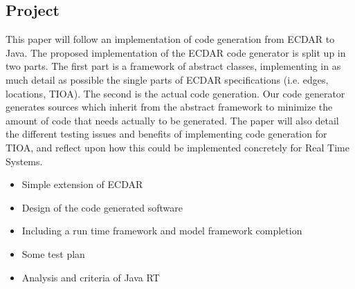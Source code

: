 \subsection{Project \label{introduction-problemfield}}
This paper will follow an implementation of code generation from ECDAR to
Java. The proposed implementation of the ECDAR code generator is split up in two
parts. The first part is a framework of abstract classes, implementing in as
much detail as possible the single parts of ECDAR specifications (i.e. edges,
locations, TIOA). The second is the actual code generation. Our code generator
generates sources which inherit from the abstract framework to minimize the
amount of code that needs actually to be generated.  The paper will also detail
the different testing issues and benefits of implementing code generation for
TIOA, and reflect upon how this could be implemented concretely for Real Time
Systems.

\begin{itemize}
\item Simple extension of ECDAR
\item Design of the code generated software
\item Including a run time framework and model framework completion
\item Some test plan
\item Analysis and criteria of Java RT
\end{itemize}
